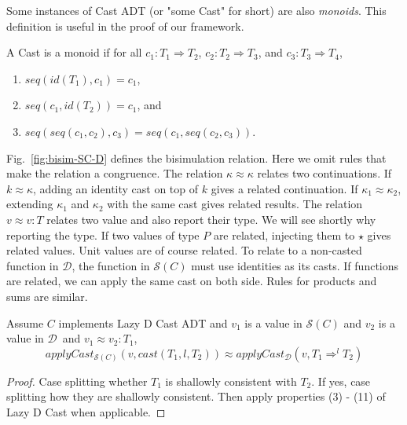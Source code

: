 \documentclass[acmsmall,review,anonymous]{acmart}\settopmatter{printfolios=true,printccs=false,printacmref=false}
\newcommand{\TOOdyn}[0]{\star}
\newcommand{\cOOcast}[3]{#1 \Rightarrow^{#2} #3}
\newcommand{\ineffCEKD}{$\mathcal{D}$}
\newcommand{\effCEK}[1]{$\mathcal{S}(#1)$}
\begin{document}
Some instances of Cast ADT (or "some Cast" for short) are also 
\textit{monoids}. This definition is useful in the proof of 
our framework.

\begin{definition}[Monoid]
	A Cast is a monoid if 
	for all
	$c_1 : T_1 \Longrightarrow T_2$,
	$c_2 : T_2 \Longrightarrow T_3$, and
	$c_3 : T_3 \Longrightarrow T_4$,
	\begin{enumerate}
		\item $seq(id(T_1),c_1) = c_1$,
		\item $seq(c_1,id(T_2)) = c_1$, and
		\item $seq(seq(c_1, c_2), c_3) = seq(c_1, seq(c_2, c_3))$.
	\end{enumerate}
\end{definition}



Fig.~\ref{fig:bisim-SC-D} defines the bisimulation relation. Here we omit rules 
that make the relation a congruence.
%
The relation $\kappa \approx \kappa$ relates two continuations. 
%
If $k \approx \kappa$, adding an identity cast on top of $k$ gives a related 
continuation. 
%
If $\kappa_1 \approx \kappa_2$, extending $\kappa_1$ and $\kappa_2$ with the 
same cast gives related results.
%
%
The relation $v \approx v : T$ relates two value and also report their type. We 
will see shortly why reporting the type. 
%
If two values of type $P$ are related, injecting them to $\TOOdyn$ gives 
related values.
%
Unit values are of course related.
%
To relate to a non-casted function in \ineffCEKD, the function in \effCEK{C} 
must use identities as its casts.
%
If functions are related, we can apply the same cast on both side.
%
Rules for products and sums are similar.

\begin{lemma}[SoAndSo]
	Assume $C$ implements Lazy D Cast ADT
	and $v_1$ is a value in \effCEK{C}
	and $v_2$ is a value in \ineffCEKD\
	and $v_1 \approx v_2 : T_1$,
	\[
	applyCast_{\text{\effCEK{C}}}(v,cast(T_1,l,T_2)) 
	\approx 
	applyCast_{\text{\ineffCEKD}}(v,\cOOcast{T_1}{l}{T_2})
	\]
\end{lemma}
\begin{proof}
	Case splitting whether $T_1$ is shallowly consistent with $T_2$.
	If yes, case splitting how they are shallowly consistent.
	Then apply properties (3) - (11) of Lazy D Cast when applicable.
\end{proof}
\end{document}
